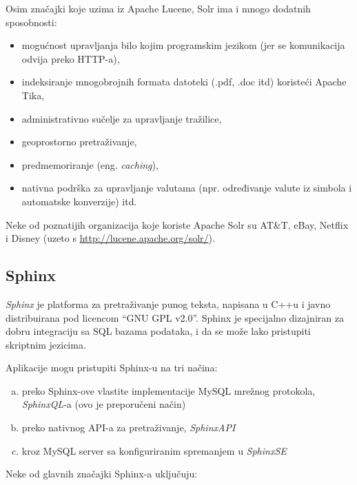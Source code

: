 \documentclass[a4paper,twoside,12pt]{scrreprt}
\begin{document}
Osim značajki koje uzima iz Apache Lucene, Solr ima i mnogo dodatnih sposobnosti:

\begin{itemize}
  \item mogućnost upravljanja bilo kojim programskim jezikom (jer se komunikacija odvija preko HTTP-a),
  \item indeksiranje mnogobrojnih formata datoteki (.pdf, .doc itd) koristeći Apache Tika,
  \item administrativno sučelje za upravljanje tražilice,
  \item geoprostorno pretraživanje,
  \item predmemoriranje (eng. \textit{caching}),
  \item nativna podrška za upravljanje valutama (npr. određivanje valute iz simbola i automatske konverzije) itd.
\end{itemize}

Neke od poznatijih organizacija koje koriste Apache Solr su AT\&T, eBay, Netflix i Disney (uzeto s \url{http://lucene.apache.org/solr/}).

\subsection{Sphinx}

\textit{Sphinx} je platforma za pretraživanje punog teksta, napisana u C++u i javno distribuirana pod licencom ``GNU GPL v2.0''. Sphinx je specijalno dizajniran za dobru integraciju sa SQL bazama podataka, i da se može lako pristupiti skriptnim jezicima.

Aplikacije mogu pristupiti Sphinx-u na tri načina:

\begin{enumerate}[(a)]
  \item preko Sphinx-ove vlastite implementacije MySQL mrežnog protokola, \textit{SphinxQL}-a (ovo je preporučeni način)
  \item preko nativnog API-a za pretraživanje, \textit{SphinxAPI}
  \item kroz MySQL server sa konfiguriranim spremanjem u \textit{SphinxSE}
\end{enumerate}

Neke od glavnih značajki Sphinx-a uključuju:
\end{document}
